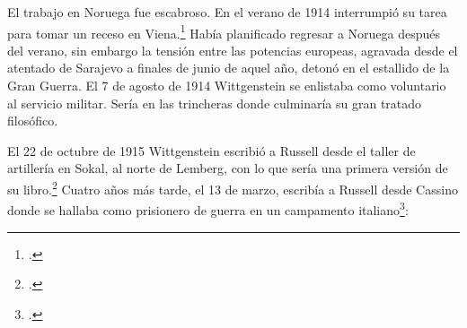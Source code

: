  El trabajo en Noruega fue escabroso.
En el verano de 1914 interrumpió su tarea para tomar un receso en
Viena.\footcite[cap. 5 loc 2154]{monk} Había planificado regresar a Noruega
después del verano, sin embargo la tensión entre las potencias europeas,
agravada desde el atentado de Sarajevo a finales de junio de aquel año, detonó
en el estallido de la Gran Guerra. El 7 de agosto de 1914 Wittgenstein se
enlistaba como voluntario al servicio militar. Sería en las trincheras donde
culminaría su gran tratado filosófico.

El 22 de octubre de 1915 Wittgenstein escribió a Russell desde el taller de
artillería en Sokal, al norte de Lemberg, con lo que sería una primera versión
de su libro.\footcite[cf. p.84]{cambridgeletters} Cuatro años más tarde, el 13
de marzo, escribía a Russell desde Cassino donde se hallaba como prisionero de
guerra en un campamento italiano\footcite[cf. p.268]{mcguinness}: 

